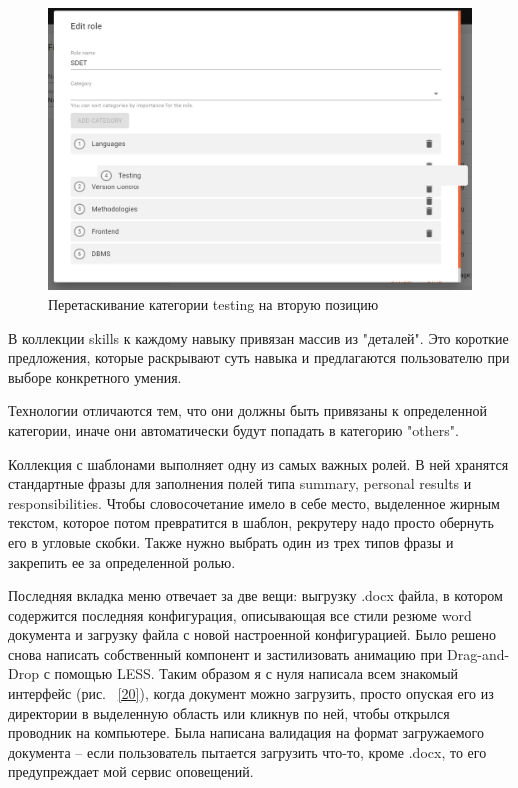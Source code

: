 \documentclass[a4paper,12pt]{diplom}
\begin{document}
\begin{figure}[!ht]
\centering
\includegraphics[width=1\textwidth]{resources/roles.png}
\caption{Перетаскивание категории testing на вторую позицию}
\label{19}
\end{figure}

В коллекции skills к каждому навыку привязан массив из "деталей". Это короткие предложения, которые раскрывают суть навыка и предлагаются пользователю при выборе конкретного умения.

Технологии отличаются тем, что они должны быть привязаны к определенной категории, иначе они автоматически будут попадать в категорию "others".

Коллекция с шаблонами выполняет одну из самых важных ролей. В ней хранятся стандартные фразы для заполнения полей типа summary, personal results и responsibilities. Чтобы словосочетание имело в себе место, выделенное жирным текстом, которое потом превратится в шаблон, рекрутеру надо просто обернуть его в угловые скобки.
Также нужно выбрать один из трех типов фразы и закрепить ее за определенной ролью.

Последняя вкладка меню отвечает за две вещи: выгрузку .docx файла, в котором содержится последняя конфигурация, описывающая все стили резюме word документа и загрузку файла с новой настроенной конфигурацией.
Было решено снова написать собственный компонент и застилизовать анимацию при Drag-and-Drop с помощью LESS. Таким образом я с нуля написала всем знакомый интерфейс (рис. ~\ref{20}), когда документ можно загрузить, просто опуская его из директории в выделенную область или кликнув по ней, чтобы открылся проводник на компьютере. Была написана валидация на формат загружаемого документа -- если пользователь пытается загрузить что-то, кроме .docx, то его предупреждает мой сервис оповещений.
\end{document}
